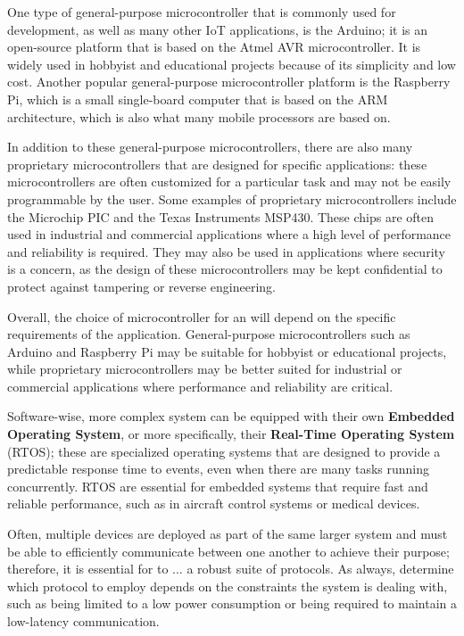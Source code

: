 One type of general-purpose microcontroller that is commonly used for \ess development, as well as many other IoT applications, is the Arduino; it is an open-source platform that is based on the Atmel AVR microcontroller. It is widely used in hobbyist and educational projects because of its simplicity and low cost. Another popular general-purpose microcontroller platform is the Raspberry Pi, which is a small single-board computer that is based on the ARM architecture, which is also what many mobile processors are based on.

In addition to these general-purpose microcontrollers, there are also many proprietary microcontrollers that are designed for specific applications: these microcontrollers are often customized for a particular task and may not be easily programmable by the user. Some examples of proprietary microcontrollers include the Microchip PIC and the Texas Instruments MSP430. These chips are often used in industrial and commercial applications where a high level of performance and reliability is required. They may also be used in applications where security is a concern, as the design of these microcontrollers may be kept confidential to protect against tampering or reverse engineering.

Overall, the choice of microcontroller for an \es will depend on the specific requirements of the application. General-purpose microcontrollers such as Arduino and Raspberry Pi may be suitable for hobbyist or educational projects, while proprietary microcontrollers may be better suited for industrial or commercial applications where performance and reliability are critical.


Software-wise, more complex system can be equipped with their own \textbf{Embedded Operating System}, or more specifically, their \textbf{Real-Time Operating System} (RTOS); these are specialized operating systems that are designed to provide a predictable response time to events, even when there are many tasks running concurrently. RTOS are essential for embedded systems that require fast and reliable performance, such as in aircraft control systems or medical devices.

Often, multiple devices are deployed as part of the same larger system and must be able to efficiently communicate between one another to achieve their purpose; therefore, it is essential for \ess to ... a robust suite of protocols.
As always, determine which protocol to employ depends on the constraints the system is dealing with, such as being limited to a low power consumption or being required to maintain a low-latency communication.

